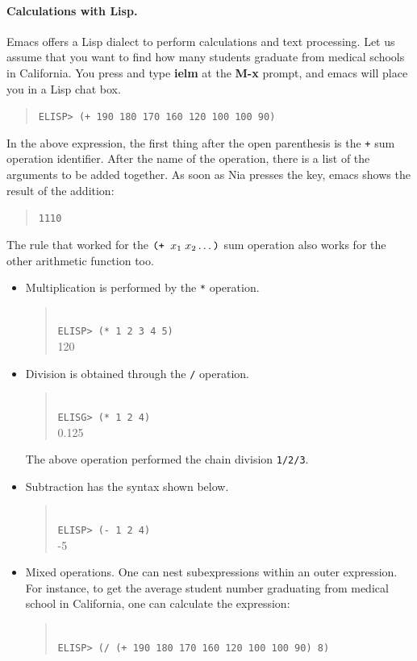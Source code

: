 \documentclass[a4paper,12pt]{book}
\begin{document}
\paragraph{Calculations with Lisp.} Emacs
offers a Lisp dialect to perform calculations
and text processing. Let us assume that you
want to find how many students graduate
from medical schools in California. You
press  and type {\bf ielm}
at the {\bf M-x} prompt, and emacs
will place you in a Lisp chat box.
\begin{quote}
\verb|ELISP> (+ 190 180 170 160 120 100 100 90)|
\end{quote}
In the above expression, the first thing after
the open parenthesis is the \verb|+| sum
operation identifier. After the name of
the operation, there is a list of
the arguments to be added together.
As soon as Nia presses the  key,
emacs shows the result of the addition:
\begin{quote}
\verb|1110|
\end{quote}
The rule that worked for 
the $\verb|(+ | x_1\;x_2\ldots\verb|)|$
sum operation also works for the 
other arithmetic function too.
\begin{itemize}
  \item{Multiplication} is performed
by the \verb|*| operation.
\begin{quote}
\keys{;}\\
\verb|ELISP> (* 1 2 3 4 5)|\\
120
\end{quote}
\item{Division} is obtained through the \verb|/| operation.
\begin{quote}
\keys{;}\\
\verb|ELISG> (* 1 2 4)|\\
0.125
\end{quote}
The above operation performed the chain
division \verb|1/2/3|.
\item{Subtraction} has the syntax shown below.
\begin{quote}
\keys{;}\\
\verb|ELISP> (- 1 2 4)|\\
-5
\end{quote}
\item Mixed operations. One can nest subexpressions
  within an outer expression. For instance,
  to get the average student number graduating
  from medical school in California, one can
  calculate the expression:
\begin{quote}
\keys{;}\\
\verb|ELISP> (/ (+ 190 180 170 160 120 100 100 90) 8)|
\end{quote}

\end{itemize}
\end{document}
